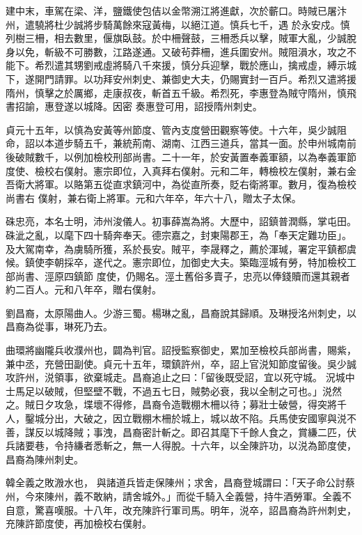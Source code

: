 \begin{pinyinscope}
 建中末，車駕在梁、洋，鹽鐵使包佶以金幣溯江將進獻，次於蘄口。時賊已屠汴州，遣驍將杜少誠將步騎萬餘來寇黃梅，以絕江道。慎兵七千，遇
 於永安戍。慎列樹三柵，相去數里，偃旗臥鼓。於中柵聲鼓，三柵悉兵以擊，賊軍大亂，少誠脫身以免，斬級不可勝數，江路遂通。又破茍莽柵，進兵圍安州。賊阻溳水，攻之不能下。希烈遣其甥劉戒虛將騎八千來援，慎分兵迎擊，戰於應山，擒戒虛，縛示城下，遂開門請罪。以功拜安州刺史、兼御史大夫，仍賜實封一百戶。希烈又遣將援隋州，慎擊之於厲鄉，走康叔夜，斬首五千級。希烈死，李惠登為賊守隋州，慎飛書招諭，惠登遂以城降。因密
 奏惠登可用，詔授隋州刺史。



 貞元十五年，以慎為安黃等州節度、管內支度營田觀察等使。十六年，吳少誠阻命，詔以本道步騎五千，兼統荊南、湖南、江西三道兵，當其一面。於申州城南前後破賊數千，以例加檢校刑部尚書。二十一年，於安黃置奉義軍額，以為奉義軍節度使、檢校右僕射。憲宗即位，入真拜右僕射。元和二年，轉檢校左僕射，兼右金吾衛大將軍。以賂第五從直求鎮河中，為從直所奏，貶右衛將軍。數月，復為檢校尚書右
 僕射，兼右衛上將軍。元和六年卒，年六十八，贈太子太保。



 硃忠亮，本名士明，沛州浚儀人。初事薛嵩為將。大歷中，詔鎮普潤縣，掌屯田。硃泚之亂，以麾下四十騎奔奉天。德宗嘉之，封東陽郡王，為「奉天定難功臣」。及大駕南幸，為虜騎所獲，系於長安。賊平，李晟釋之，薦於渾瑊，署定平鎮都虞候。鎮使李朝採卒，遂代之。憲宗即位，加御史大夫。築臨涇城有勞，特加檢校工部尚書、涇原四鎮節
 度使，仍賜名。涇土舊俗多賣子，忠亮以俸錢贖而還其親者約二百人。元和八年卒，贈右僕射。



 劉昌裔，太原陽曲人。少游三蜀。楊琳之亂，昌裔說其歸順。及琳授洺州刺史，以昌裔為從事，琳死乃去。



 曲環將幽隴兵收濮州也，闢為判官。詔授監察御史，累加至檢校兵部尚書，賜紫，兼中丞，充營田副使。貞元十五年，環鎮許州，卒，詔上官涚知節度留後。吳少誠攻許州，涚領事，欲棄城走。昌裔追止之曰：「留後既受詔，宜以死守城。
 況城中士馬足以破賊，但堅壁不戰，不過五七日，賊勢必衰，我以全制之可也。」涚然之。賊日夕攻急，堞壞不得修，昌裔令造戰棚木柵以待；募壯士破營，得突將千人，鑿城分出，大破之，因立戰棚木柵於城上，城以故不陷。兵馬使安國寧與涚不善，謀反以城降賊；事洩，昌裔密計斬之。即召其麾下千餘人食之，賞縑二匹，伏兵諸要巷，令持縑者悉斬之，無一人得脫。十六年，以全陳許功，以涚為節度使，昌裔為陳州刺史。



 韓全義之敗溵水也，
 與諸道兵皆走保陳州；求舍，昌裔登城謂曰：「天子命公討蔡州，今來陳州，義不敢納，請舍城外。」而從千騎入全義營，持牛酒勞軍。全義不自意，驚喜嘆服。十八年，改充陳許行軍司馬。明年，涚卒，詔昌裔為許州刺史，充陳許節度使，再加檢校右僕射。




\end{pinyinscope}
